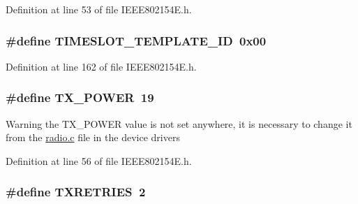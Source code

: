 Definition at line 53 of file I\+E\+E\+E802154\+E.\+h.

\subsubsection[{\texorpdfstring{T\+I\+M\+E\+S\+L\+O\+T\+\_\+\+T\+E\+M\+P\+L\+A\+T\+E\+\_\+\+ID}{TIMESLOT_TEMPLATE_ID}}]{\setlength{\rightskip}{0pt plus 5cm}\#define T\+I\+M\+E\+S\+L\+O\+T\+\_\+\+T\+E\+M\+P\+L\+A\+T\+E\+\_\+\+ID~0x00}\hypertarget{group___i_e_e_e802154_e_gae1676f8dd0170ab364f830bc66294635}{}\label{group___i_e_e_e802154_e_gae1676f8dd0170ab364f830bc66294635}


Definition at line 162 of file I\+E\+E\+E802154\+E.\+h.

\subsubsection[{\texorpdfstring{T\+X\+\_\+\+P\+O\+W\+ER}{TX_POWER}}]{\setlength{\rightskip}{0pt plus 5cm}\#define T\+X\+\_\+\+P\+O\+W\+ER~19}\hypertarget{group___i_e_e_e802154_e_ga8bc4773990d12a21438d91a86890b0db}{}\label{group___i_e_e_e802154_e_ga8bc4773990d12a21438d91a86890b0db}
\begin{DoxyWarning}{Warning}
the T\+X\+\_\+\+P\+O\+W\+ER value is not set anywhere, it is necessary to change it from the \hyperlink{chips_2cc2420_2radio_8c}{radio.\+c} file in the device drivers 
\end{DoxyWarning}


Definition at line 56 of file I\+E\+E\+E802154\+E.\+h.

\subsubsection[{\texorpdfstring{T\+X\+R\+E\+T\+R\+I\+ES}{TXRETRIES}}]{\setlength{\rightskip}{0pt plus 5cm}\#define T\+X\+R\+E\+T\+R\+I\+ES~2}\hypertarget{group___i_e_e_e802154_e_ga2ad5d0a4cdd37feb8c5e52db2978062f}{}\label{group___i_e_e_e802154_e_ga2ad5d0a4cdd37feb8c5e52db2978062f}


